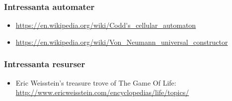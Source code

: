 \subsubsection{Intressanta automater}

\begin{itemize}[noitemsep,topsep=0pt]
	\item \url{https://en.wikipedia.org/wiki/Codd's_cellular_automaton}
	\item \url{https://en.wikipedia.org/wiki/Von_Neumann_universal_constructor}
\end{itemize}

\subsubsection{Intressanta resurser}

\begin{itemize}[noitemsep,topsep=0pt]
    \item Eric Weisstein's treasure trove of The Game Of Life: \url{http://www.ericweisstein.com/encyclopedias/life/topics/}
\end{itemize}










